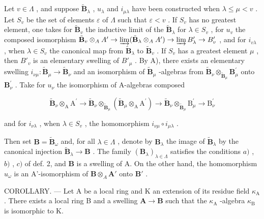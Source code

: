 Let \(v \in \Lambda\) , and suppose \(\tilde{\mathbf{B}}_{\lambda}\) , \(u_{\lambda}\) and \(i_{\mu \lambda}\) have been constructed when \(\lambda \leqslant \mu < v\) . Let \(S_v\) be the set of elements \(\varepsilon\) of \(\Lambda\) such that \(\varepsilon < v\) . If \(S_v\) has no greatest element, one takes for \(\tilde{\mathbf{B}}_v\) the inductive limit of the \(\tilde{\mathbf{B}}_{\lambda}\) for \(\lambda \in S_v\) , for \(u_v\) the composed isomorphism \(\tilde{\mathbf{B}}_v \otimes_A A' \to \varinjlim (\tilde{\mathbf{B}}_{\lambda} \otimes_A A') \to \varinjlim B'_\lambda \to B'_v\) , and for \(i_{v\lambda}\) , when \(\lambda \in S_v\) the canonical map from \(\tilde{\mathbf{B}}_{\lambda}\) to \(\tilde{\mathbf{B}}_v\) . If \(S_v\) has a greatest element \(\mu\) , then \(B'_v\) is an elementary swelling of \(B'_\mu\) . By A), there exists an elementary swelling \(i_{\nu \mu}:\tilde{\mathbf{B}}_{\mu}\to \tilde{\mathbf{B}}_{\nu}\) and an isomorphism of \(\tilde{\mathbf{B}}_{\mu}\) -algebras from \(\tilde{\mathbf{B}}_{\nu}\otimes_{\tilde{\mathbf{B}}_{\mu}}\mathbf{B}_{\mu}^{\prime}\) onto \(\mathbf{B}_{\nu}^{\prime}\) . Take for \(u_{\nu}\) the isomorphism of A-algebras composed

\[
\widetilde {\mathbf {B}} _ {\nu} \otimes_ {\mathrm{A}} \mathrm{A} ^ {\prime} \rightarrow \widetilde {\mathbf {B}} _ {\nu} \otimes_ {\widetilde {\mathbf {B}} _ {\mu}} (\widetilde {\mathbf {B}} _ {\mu} \otimes_ {\mathrm{A}} \mathrm{A} ^ {\prime}) \rightarrow \widetilde {\mathbf {B}} _ {\nu} \otimes_ {\widetilde {\mathbf {B}} _ {\mu}} \mathrm{B} _ {\mu} ^ {\prime} \rightarrow \mathrm{B} _ {\nu} ^ {\prime}
\]

and for \(i_{\nu \lambda}\) , when \(\lambda \in S_{v}\) , the homomorphism \(i_{\nu \mu} \circ i_{\mu \lambda}\) .

Then set \(\mathbf{B} = \tilde{\mathbf{B}}_{\omega}\) and, for all \(\lambda \in \Lambda\) , denote by \(\mathbf{B}_{\lambda}\) the image of \(\tilde{\mathbf{B}}_{\lambda}\) by the canonical injection \(\tilde{\mathbf{B}}_{\lambda} \to \mathbf{B}\) . The family \((\mathbf{B}_{\lambda})_{\lambda \in \Lambda}\) satisfies the conditions \(a)\) , \(b)\) , \(c)\) of def. 2, and \(\mathbf{B}\) is a swelling of A. On the other hand, the homomorphism \(u_{\omega}\) is an A'-isomorphism of \(\mathbf{B} \otimes_{A} \mathbf{A}'\) onto \(\mathbf{B}'\) .

COROLLARY. --- Let A be a local ring and K an extension of its residue field \(\kappa_{\mathrm{A}}\). There exists a local ring B and a swelling \(\mathbf{A} \to \mathbf{B}\) such that the \(\kappa_{\mathrm{A}}\) -algebra \(\kappa_{\mathrm{B}}\) is isomorphic to K.

